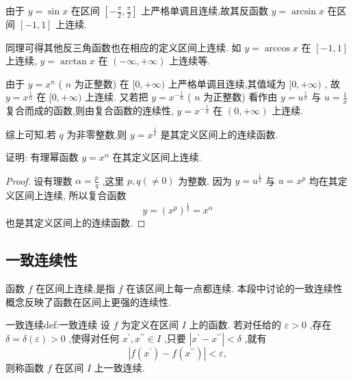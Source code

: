 \begin{example}

由于 \(y = \sin x\) 在区间 \(\left\lbrack  {-\frac{\pi }{2},\frac{\pi }{2}}\right\rbrack\) 上严格单调且连续,故其反函数 \(y = \arcsin x\) 在区间 \(\left\lbrack  {-1,1}\right\rbrack\) 上连续.

同理可得其他反三角函数也在相应的定义区间上连续. 如 \(y = \arccos x\) 在 \(\left\lbrack  {-1,1}\right\rbrack\) 上连续, \(y = \arctan x\) 在 \(\left( {-\infty , + \infty }\right)\) 上连续等.

\end{example}
\begin{example}

由于 \(y = {x}^{n}\) ( \(n\) 为正整数) 在 \(\lbrack 0, + \infty )\) 上严格单调且连续,其值域为 \(\lbrack 0, + \infty )\) , 故 \(y = {x}^{\frac{1}{n}}\) 在 \(\lbrack 0, + \infty )\) 上连续. 又若把 \(y = {x}^{-\frac{1}{n}}\) ( \(n\) 为正整数) 看作由 \(y = {u}^{\frac{1}{n}}\) 与 \(u = \frac{1}{x}\) 复合而成的函数,则由复合函数的连续性, \(y = {x}^{-\frac{1}{n}}\) 在 \(\left( {0, + \infty }\right)\) 上连续.

综上可知,若 \(q\) 为非零整数,则 \(y = {x}^{\frac{1}{q}}\) 是其定义区间上的连续函数.

\end{example}

\begin{example}
证明: 有理幂函数 \(y = {x}^{\alpha }\) 在其定义区间上连续.
\end{example}


\begin{proof}
设有理数 \(\alpha  = \frac{p}{q}\) ,这里 \(p,q\left( { \neq  0}\right)\) 为整数. 因为 \(y = {u}^{\frac{1}{q}}\) 与 \(u = {x}^{p}\) 均在其定义区间上连续, 所以复合函数
\[
y = {\left( {x}^{p}\right) }^{\frac{1}{q}} = {x}^{\alpha }
\]
也是其定义区间上的连续函数.
\end{proof}


\subsection{一致连续性}

函数 \(f\) 在区间上连续,是指 \(f\) 在该区间上每一点都连续. 本段中讨论的一致连续性概念反映了函数在区间上更强的连续性.

\begin{definition}{一致连续}{def:一致连续}
设 \(f\) 为定义在区间 \(I\) 上的函数. 若对任给的 \(\varepsilon  > 0\) ,存在 \(\delta  = \delta \left( \varepsilon \right)  > 0\) ,使得对任何 \({x}^{\prime },{x}^{\prime \prime } \in  I\) ,只要 \(\left| {{x}^{\prime } - {x}^{\prime \prime }}\right|  < \delta\) ,就有
\[
\left| {f\left( {x}^{\prime }\right)  - f\left( {x}^{\prime \prime }\right) }\right|  < \varepsilon ,
\]
则称函数 \(f\) 在区间 \(I\) 上一致连续.
\end{definition}


